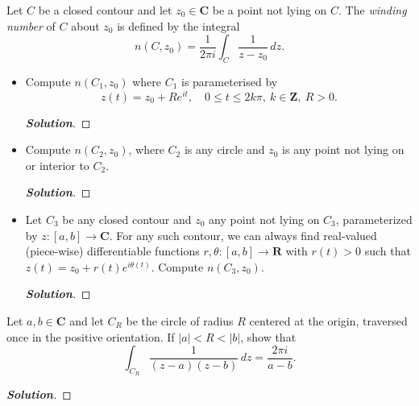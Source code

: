 \documentclass[11pt]{article}
\newenvironment{problem}[2][Problem\!]{\begin{trivlist}
\item[\hskip \labelsep {\bfseries #1}\hskip \labelsep {\bfseries #2.}]}{\end{trivlist}}
\newenvironment{solution}{\begin{proof}[\textbf{\textit{Solution}}]}{\end{proof}}
\newcommand{\zz}{\mathbf Z}   %
\newcommand{\rr}{\mathbf R}   %
\newcommand{\cc}{\mathbf C}   %
\newcommand{\abs}[1]{\left\lvert#1\right\rvert} %
\renewcommand{\leq}{\leqslant}
\begin{document}
\begin{problem}{7.3}
Let $C$ be a closed contour and let $z_0 \in \cc$ be a point not lying on $C$. The \emph{winding number} of $C$ about $z_0$ is defined by the integral
\[n(C,z_0) = \frac{1}{2\pi i}\int_C \frac{1}{z-z_0} \, dz.\]
\begin{itemize}[itemsep=3em]
\item[(a)] Compute $n(C_1,z_0)$ where $C_1$ is parameterised by \[z(t) = z_0 + Re^{it},\quad 0 \leq t \leq 2k\pi,\ k\in \zz,\ R>0.\] 
\begin{solution}
\end{solution}

\item[(b)] Compute $n(C_2,z_0)$, where $C_2$ is any circle and $z_0$ is any point not lying on or interior to $C_2$. 
\begin{solution}
\end{solution}

\item[(c)] Let $C_3$ be any closed contour and $z_0$ any point not lying on $C_3$, parameterized by $z:[a,b] \to \cc$. For any such contour, we can always find real-valued (piece-wise) differentiable functions $r,\theta :[a,b] \to \rr$ with $r(t)>0$ such that $z(t) = z_0 + r(t) e^{i\theta(t)}$. Compute $n(C_3,z_0)$.  
\begin{solution}
\end{solution}

\end{itemize}
\end{problem}

\newpage  %

\begin{problem}{7.4}
Let $a,b \in \cc$ and let $C_R$ be the circle of radius $R$ centered at the origin, traversed once in the positive orientation. If $\abs{a} < R < \abs{b}$, show that
\[\int_{C_R} \frac{1}{(z-a)(z-b)}\, dz = \frac{2\pi i}{a-b}.\]
\end{problem}
\begin{solution}
\end{solution}
\end{document}
